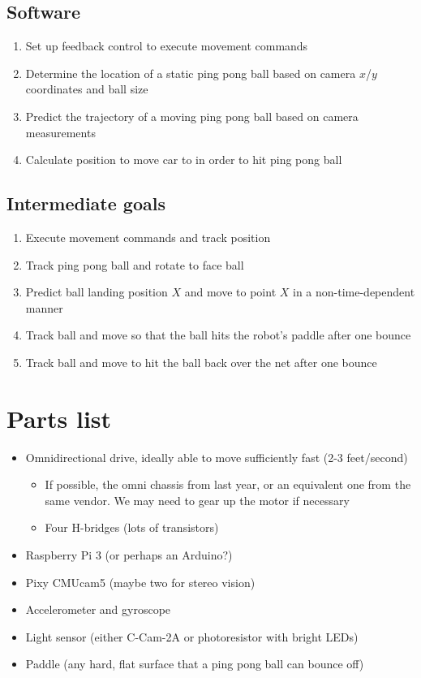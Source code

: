 \documentclass[letterpaper, 11pt]{article}
\begin{document}
\subsection*{Software}
\begin{enumerate}[label=\textbf{(\arabic*)}]
    \item Set up feedback control to execute movement commands
    \item Determine the location of a static ping pong ball based on camera $x$/$y$ coordinates and ball size
    \item Predict the trajectory of a moving ping pong ball based on camera measurements
    \item Calculate position to move car to in order to hit ping pong ball
\end{enumerate}

\subsection*{Intermediate goals}
\begin{enumerate}[label=\textbf{(\arabic*)}]
    \item Execute movement commands and track position
    \item Track ping pong ball and rotate to face ball
    \item Predict ball landing position $X$ and move to point $X$ in a non-time-dependent manner
    \item Track ball and move so that the ball hits the robot's paddle after one bounce
    \item Track ball and move to hit the ball back over the net after one bounce
\end{enumerate}

\section{Parts list}
\begin{itemize}
    \item Omnidirectional drive, ideally able to move sufficiently fast (2-3 feet/second)
        \begin{itemize}
            \item If possible, the omni chassis from last year, or an equivalent one from the same vendor. We may need to gear up the motor if necessary
            \item Four H-bridges (lots of transistors)
        \end{itemize}
    \item Raspberry Pi 3 (or perhaps an Arduino?)
    \item Pixy CMUcam5 (maybe two for stereo vision)
    \item Accelerometer and gyroscope
    \item Light sensor (either C-Cam-2A or photoresistor with bright LEDs)
    \item Paddle (any hard, flat surface that a ping pong ball can bounce off)
\end{itemize}
\end{document}
